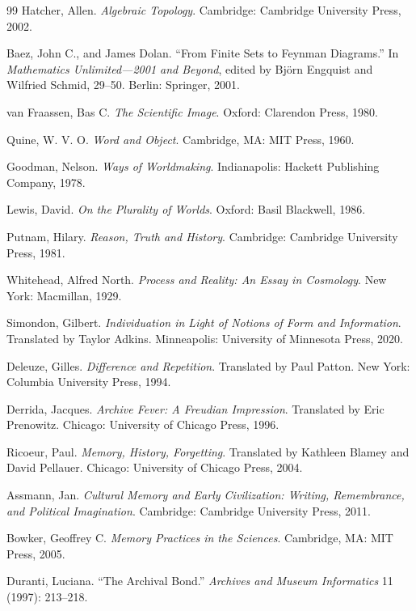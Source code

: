 \documentclass[
  11pt,
  a4paper,
  DIV=12,
  BCOR=0mm,
  parskip=half-
]{scrartcl}
\theoremstyle{definition}
\theoremstyle{plain}
\theoremstyle{remark}
\begin{document}
\begin{thebibliography}{99}
Hatcher, Allen.
\emph{Algebraic Topology}.
Cambridge: Cambridge University Press, 2002.

Baez, John C., and James Dolan.
``From Finite Sets to Feynman Diagrams.''
In \emph{Mathematics Unlimited---2001 and Beyond},
edited by Bj\"orn Engquist and Wilfried Schmid, 29--50.
Berlin: Springer, 2001.

van Fraassen, Bas C.
\emph{The Scientific Image}.
Oxford: Clarendon Press, 1980.

Quine, W. V. O.
\emph{Word and Object}.
Cambridge, MA: MIT Press, 1960.

Goodman, Nelson.
\emph{Ways of Worldmaking}.
Indianapolis: Hackett Publishing Company, 1978.

Lewis, David.
\emph{On the Plurality of Worlds}.
Oxford: Basil Blackwell, 1986.

Putnam, Hilary.
\emph{Reason, Truth and History}.
Cambridge: Cambridge University Press, 1981.

Whitehead, Alfred North.
\emph{Process and Reality: An Essay in Cosmology}.
New York: Macmillan, 1929.

Simondon, Gilbert.
\emph{Individuation in Light of Notions of Form and Information}.
Translated by Taylor Adkins.
Minneapolis: University of Minnesota Press, 2020.

Deleuze, Gilles.
\emph{Difference and Repetition}.
Translated by Paul Patton.
New York: Columbia University Press, 1994.

Derrida, Jacques.
\emph{Archive Fever: A Freudian Impression}.
Translated by Eric Prenowitz.
Chicago: University of Chicago Press, 1996.

Ricoeur, Paul.
\emph{Memory, History, Forgetting}.
Translated by Kathleen Blamey and David Pellauer.
Chicago: University of Chicago Press, 2004.

Assmann, Jan.
\emph{Cultural Memory and Early Civilization: Writing, Remembrance, and
Political Imagination}.
Cambridge: Cambridge University Press, 2011.

Bowker, Geoffrey C.
\emph{Memory Practices in the Sciences}.
Cambridge, MA: MIT Press, 2005.

Duranti, Luciana.
``The Archival Bond.''
\emph{Archives and Museum Informatics}
11 (1997): 213--218.


\end{thebibliography}
\end{document}
